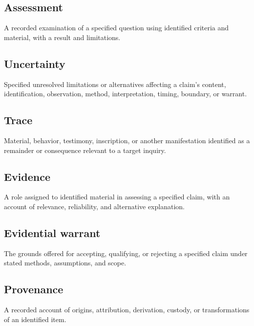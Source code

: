 \documentclass[11pt,a4paper]{article}
\begin{document}
\subsection{Assessment}
A recorded examination of a specified question using identified criteria and material, with a result and limitations.

\subsection{Uncertainty}
Specified unresolved limitations or alternatives affecting a claim's content, identification, observation, method, interpretation, timing, boundary, or warrant.

\subsection{Trace}
Material, behavior, testimony, inscription, or another manifestation identified as a remainder or consequence relevant to a target inquiry.

\subsection{Evidence}
A role assigned to identified material in assessing a specified claim, with an account of relevance, reliability, and alternative explanation.

\subsection{Evidential warrant}
The grounds offered for accepting, qualifying, or rejecting a specified claim under stated methods, assumptions, and scope.

\subsection{Provenance}
A recorded account of origins, attribution, derivation, custody, or transformations of an identified item.
\end{document}
